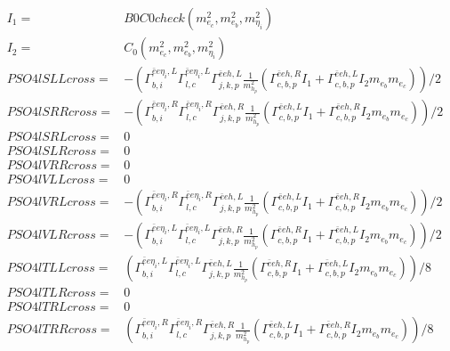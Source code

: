 \documentclass[A4,landscape]{article}
\begin{document}
\begin{align} 
I_1= & B0C0check(m^2_{e_{{c}}}, m^2_{e_{{b}}}, m^2_{\eta_i}) \\ 
I_2= & C_0(m^2_{e_{{c}}}, m^2_{e_{{b}}}, m^2_{\eta_i}) \\ 
  PSO4lSLLcross= & -( \Gamma^{\bar{e}e \eta_i ,L}_{b, i} \Gamma^{\bar{e}e \eta_i ,L}_{l, c} \Gamma^{\bar{e}e h ,L}_{j, k, p} \frac{1}{m^2_{h_{{p}}}} (\Gamma^{\bar{e}e h ,R}_{c, b, p} I_1 + \Gamma^{\bar{e}e h ,L}_{c, b, p} I_2 m_{e_{{b}}} m_{e_{{c}}}))/2 \\ 
  PSO4lSRRcross= & -( \Gamma^{\bar{e}e \eta_i ,R}_{b, i} \Gamma^{\bar{e}e \eta_i ,R}_{l, c} \Gamma^{\bar{e}e h ,R}_{j, k, p} \frac{1}{m^2_{h_{{p}}}} (\Gamma^{\bar{e}e h ,L}_{c, b, p} I_1 + \Gamma^{\bar{e}e h ,R}_{c, b, p} I_2 m_{e_{{b}}} m_{e_{{c}}}))/2 \\ 
  PSO4lSRLcross= & 0 \\ 
  PSO4lSLRcross= & 0 \\ 
  PSO4lVRRcross= & 0 \\ 
  PSO4lVLLcross= & 0 \\ 
  PSO4lVRLcross= & -( \Gamma^{\bar{e}e \eta_i ,R}_{b, i} \Gamma^{\bar{e}e \eta_i ,R}_{l, c} \Gamma^{\bar{e}e h ,L}_{j, k, p} \frac{1}{m^2_{h_{{p}}}} (\Gamma^{\bar{e}e h ,L}_{c, b, p} I_1 + \Gamma^{\bar{e}e h ,R}_{c, b, p} I_2 m_{e_{{b}}} m_{e_{{c}}}))/2 \\ 
  PSO4lVLRcross= & -( \Gamma^{\bar{e}e \eta_i ,L}_{b, i} \Gamma^{\bar{e}e \eta_i ,L}_{l, c} \Gamma^{\bar{e}e h ,R}_{j, k, p} \frac{1}{m^2_{h_{{p}}}} (\Gamma^{\bar{e}e h ,R}_{c, b, p} I_1 + \Gamma^{\bar{e}e h ,L}_{c, b, p} I_2 m_{e_{{b}}} m_{e_{{c}}}))/2 \\ 
  PSO4lTLLcross= & ( \Gamma^{\bar{e}e \eta_i ,L}_{b, i} \Gamma^{\bar{e}e \eta_i ,L}_{l, c} \Gamma^{\bar{e}e h ,L}_{j, k, p} \frac{1}{m^2_{h_{{p}}}} (\Gamma^{\bar{e}e h ,R}_{c, b, p} I_1 + \Gamma^{\bar{e}e h ,L}_{c, b, p} I_2 m_{e_{{b}}} m_{e_{{c}}}))/8 \\ 
  PSO4lTLRcross= & 0 \\ 
  PSO4lTRLcross= & 0 \\ 
  PSO4lTRRcross= & ( \Gamma^{\bar{e}e \eta_i ,R}_{b, i} \Gamma^{\bar{e}e \eta_i ,R}_{l, c} \Gamma^{\bar{e}e h ,R}_{j, k, p} \frac{1}{m^2_{h_{{p}}}} (\Gamma^{\bar{e}e h ,L}_{c, b, p} I_1 + \Gamma^{\bar{e}e h ,R}_{c, b, p} I_2 m_{e_{{b}}} m_{e_{{c}}}))/8 \\ 
\end{align} 
\end{document}
